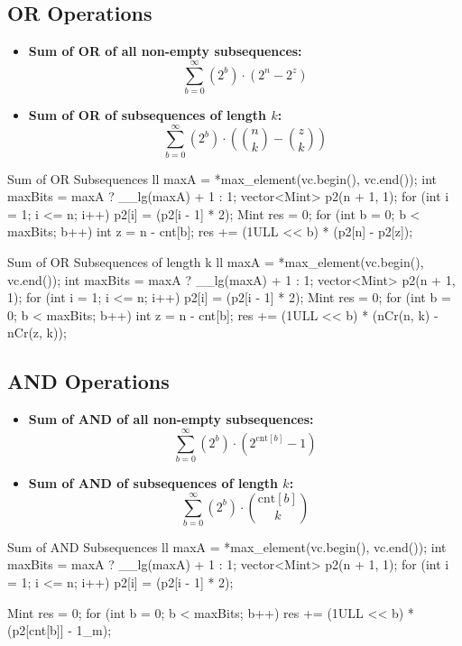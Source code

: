 \documentclass[10pt]{article}
\newcommand{\complexity}[1]{%
  \tcbox[on line,
    colback=tagbg,
    colframe=tagbg,
    boxrule=0pt,
    arc=2pt,
    boxsep=0pt,
    left=3.5pt, right=3.5pt, top=1.5pt, bottom=1.5pt
  ]{\color{tagtext}\scriptsize\bfseries\ensuremath{#1}}%
}
\begin{document}
\newpage
\subsection{OR Operations}
\begin{itemize}
    \item \textbf{Sum of OR of all non-empty subsequences:}
          \[ \sum_{b = 0}^{\infty} (2^b) \cdot (2^n - 2^{z}) \]
    \item \textbf{Sum of OR of subsequences of length $k$:}
          \[ \sum_{b = 0}^{\infty} (2^b) \cdot \left( \binom{n}{k} - \binom{z}{k} \right) \]
\end{itemize}

\begin{vscode}{Sum of OR Subsequences \complexity{O(N \log(\max A))}}
ll maxA = *max_element(vc.begin(), vc.end());
int maxBits = maxA ? __lg(maxA) + 1 : 1;
vector<Mint> p2(n + 1, 1);
for (int i = 1; i <= n; i++) 
    p2[i] = (p2[i - 1] * 2);
Mint res = 0;
for (int b = 0; b < maxBits; b++) 
{
    int z = n - cnt[b];
    res += (1ULL << b) * (p2[n] - p2[z]);
}
\end{vscode}

\begin{vscode}{Sum of OR Subsequences of length k \complexity{O(N \log(\max A))}}
ll maxA = *max_element(vc.begin(), vc.end());
int maxBits = maxA ? __lg(maxA) + 1 : 1;
vector<Mint> p2(n + 1, 1);
for (int i = 1; i <= n; i++) 
    p2[i] = (p2[i - 1] * 2);
Mint res = 0;
for (int b = 0; b < maxBits; b++) 
{
    int z = n - cnt[b];
    res += (1ULL << b) * (nCr(n, k) - nCr(z, k));
}
\end{vscode}

\newpage
\subsection{AND Operations}
\begin{itemize}
    \item \textbf{Sum of AND of all non-empty subsequences:}
          \[ \sum_{b = 0}^{\infty} (2^b) \cdot (2^{\text{cnt}[b]} - 1) \]
    \item \textbf{Sum of AND of subsequences of length $k$:}
          \[ \sum_{b = 0}^{\infty} (2^b) \cdot \binom{\text{cnt}[b]}{k} \]
\end{itemize}

\begin{vscode}{Sum of AND Subsequences \complexity{O(N \log(\max A))}}
ll maxA = *max_element(vc.begin(), vc.end());
int maxBits = maxA ? __lg(maxA) + 1 : 1;
vector<Mint> p2(n + 1, 1);
for (int i = 1; i <= n; i++) 
    p2[i] = (p2[i - 1] * 2);

Mint res = 0;
for (int b = 0; b < maxBits; b++) 
    res += (1ULL << b) * (p2[cnt[b]] - 1_m);
\end{vscode}
\end{document}
